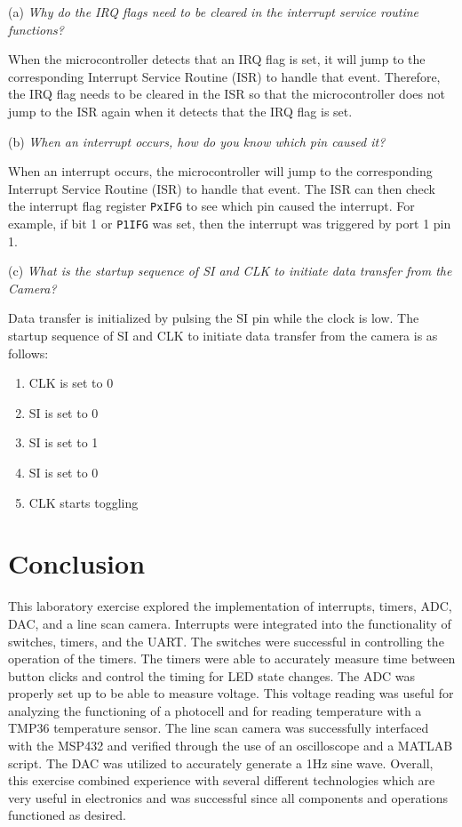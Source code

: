 \documentclass[CMPE]{KGCOEReport}
\begin{document}
(a) \emph{Why do the IRQ flags need to be cleared in the interrupt service routine functions?}

When the microcontroller detects that an IRQ flag is set, it will jump to the corresponding Interrupt Service Routine (ISR) to handle that event. Therefore, the IRQ flag needs to be cleared in the ISR so that the microcontroller does not jump to the ISR again when it detects that the IRQ flag is set.
\bigskip

(b) \emph{When an interrupt occurs, how do you know which pin caused it?}

When an interrupt occurs, the microcontroller will jump to the corresponding Interrupt Service Routine (ISR) to handle that event. The ISR can then check the interrupt flag register \verb|PxIFG| to see which pin caused the interrupt. For example, if bit 1 or \verb|P1IFG| was set, then the interrupt was triggered by port 1 pin 1.
\bigskip

(c) \emph{What is the startup sequence of SI and CLK to initiate data transfer from the Camera?}


Data transfer is initialized by pulsing the SI pin while the clock is low. The startup sequence of SI and CLK to initiate data transfer from the camera is as follows:

\begin{enumerate}
    \item CLK is set to 0
    \item SI is set to 0
    \item SI is set to 1
    \item SI is set to 0
    \item CLK starts toggling
\end{enumerate}

\section*{Conclusion}

This laboratory exercise explored the implementation of interrupts, timers, ADC, DAC, and a line scan camera. Interrupts were integrated into the functionality of switches, timers, and the UART. The switches were successful in controlling the operation of the timers. The timers were able to accurately measure time between button clicks and control the timing for LED state changes. The ADC was properly set up to be able to measure voltage. This voltage reading was useful for analyzing the functioning of a photocell and for reading temperature with a TMP36 temperature sensor. The line scan camera was successfully interfaced with the MSP432 and verified through the use of an oscilloscope and a MATLAB script. The DAC was utilized to accurately generate a 1Hz sine wave. Overall, this exercise combined experience with several different technologies which are very useful in electronics and was successful since all components and operations functioned as desired. 
\end{document}
